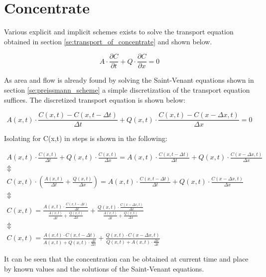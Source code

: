 \section{Concentrate}\label{sec:concentrate}

Various explicit and implicit schemes exists to solve the transport equation obtained in section \ref{se:transport_of_concentrate} and shown below.

\begin{equation}
A \cdot \frac{\partial C}{\partial t} + Q \cdot \frac{\partial C}{\partial x} = 0
\label{eq:transport_sim}
\end{equation}

As area and flow is already found by solving the Saint-Venant equations shown in section \ref{se:preissmann_scheme} a simple discretization of the transport equation suffices.
The discretized transport equation is shown below:

\begin{equation}
	A(x,t) \cdot \frac{C(x,t) - C(x,t-\Delta t)}{\Delta t} + Q(x,t) \cdot \frac{C(x,t)-C(x-\Delta x,t)}{\Delta x} = 0
\end{equation}

Isolating for C(x,t) in steps is shown in the following:

\begin{equation}
\begin{array}{l}
	A(x,t) \cdot \frac{C(x,t)}{\Delta t} + Q(x,t) \cdot \frac{C(x,t)}{\Delta x} = A(x,t) \cdot \frac{C(x,t-\Delta t)}{\Delta t} + Q(x,t) \cdot \frac{C(x-\Delta x,t)}{\Delta x} \\

	\Updownarrow \\

C(x,t) \cdot \left( \frac{A(x,t)}{\Delta t} + \frac{Q(x,t)}{\Delta x} \right) = A(x,t) \cdot \frac{C(x,t-\Delta t)}{\Delta t} + Q(x,t) \cdot \frac{C(x-\Delta x,t)}{\Delta x} \\

\Updownarrow \\

C(x,t) = \frac{ A(x,t) \cdot \frac{C(x,t-\Delta t)}{\Delta t}}{\frac{A(x,t)}{\Delta t} + \frac{Q(x,t)}{\Delta x}}   +   \frac{ Q(x,t) \cdot \frac{C(x-\Delta x,t)}{\Delta x}}{\frac{A(x,t)}{\Delta t} + \frac{Q(x,t)}{\Delta x}} \\

\Updownarrow \\

C(x,t) = \frac{ A(x,t) \cdot C(x,t-\Delta t) }{ A(x,t)+Q(x,t) \cdot \frac{\Delta t}{ \Delta x} } + \frac{Q(x,t) \cdot C(x-\Delta x,t)}{Q(x,t)+A(x,t)\cdot \frac{\Delta x}{\Delta t}}

\end{array}	
\end{equation}

It can be seen that the concentration can be obtained at current time and place by known values and the solutions of the Saint-Venant equations.
